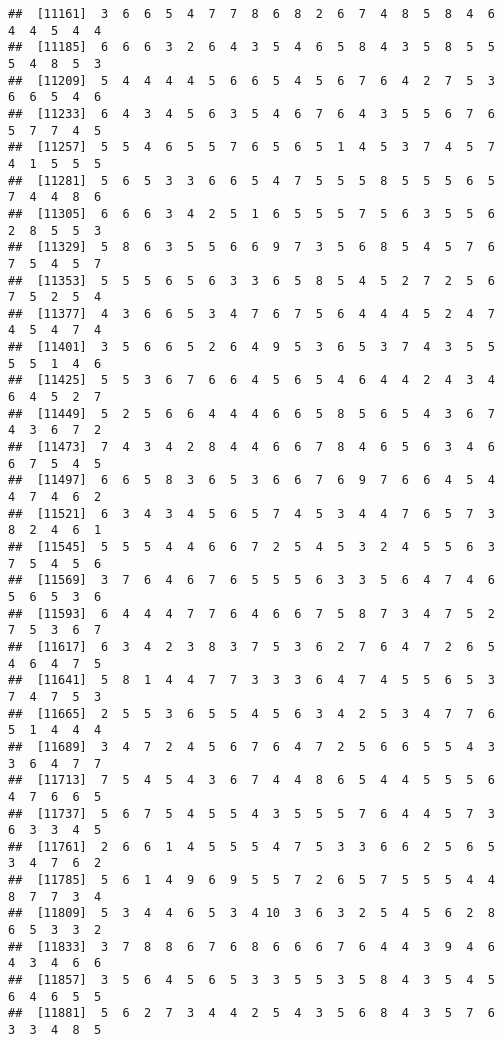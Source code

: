 \documentclass[
]{book}
\begin{document}
\begin{verbatim}
##  [11161]  3  6  6  5  4  7  7  8  6  8  2  6  7  4  8  5  8  4  6  4  4  5  4  4
##  [11185]  6  6  6  3  2  6  4  3  5  4  6  5  8  4  3  5  8  5  5  5  4  8  5  3
##  [11209]  5  4  4  4  4  5  6  6  5  4  5  6  7  6  4  2  7  5  3  6  6  5  4  6
##  [11233]  6  4  3  4  5  6  3  5  4  6  7  6  4  3  5  5  6  7  6  5  7  7  4  5
##  [11257]  5  5  4  6  5  5  7  6  5  6  5  1  4  5  3  7  4  5  7  4  1  5  5  5
##  [11281]  5  6  5  3  3  6  6  5  4  7  5  5  5  8  5  5  5  6  5  7  4  4  8  6
##  [11305]  6  6  6  3  4  2  5  1  6  5  5  5  7  5  6  3  5  5  6  2  8  5  5  3
##  [11329]  5  8  6  3  5  5  6  6  9  7  3  5  6  8  5  4  5  7  6  7  5  4  5  7
##  [11353]  5  5  5  6  5  6  3  3  6  5  8  5  4  5  2  7  2  5  6  7  5  2  5  4
##  [11377]  4  3  6  6  5  3  4  7  6  7  5  6  4  4  4  5  2  4  7  4  5  4  7  4
##  [11401]  3  5  6  6  5  2  6  4  9  5  3  6  5  3  7  4  3  5  5  5  5  1  4  6
##  [11425]  5  5  3  6  7  6  6  4  5  6  5  4  6  4  4  2  4  3  4  6  4  5  2  7
##  [11449]  5  2  5  6  6  4  4  4  6  6  5  8  5  6  5  4  3  6  7  4  3  6  7  2
##  [11473]  7  4  3  4  2  8  4  4  6  6  7  8  4  6  5  6  3  4  6  6  7  5  4  5
##  [11497]  6  6  5  8  3  6  5  3  6  6  7  6  9  7  6  6  4  5  4  4  7  4  6  2
##  [11521]  6  3  4  3  4  5  6  5  7  4  5  3  4  4  7  6  5  7  3  8  2  4  6  1
##  [11545]  5  5  5  4  4  6  6  7  2  5  4  5  3  2  4  5  5  6  3  7  5  4  5  6
##  [11569]  3  7  6  4  6  7  6  5  5  5  6  3  3  5  6  4  7  4  6  5  6  5  3  6
##  [11593]  6  4  4  4  7  7  6  4  6  6  7  5  8  7  3  4  7  5  2  7  5  3  6  7
##  [11617]  6  3  4  2  3  8  3  7  5  3  6  2  7  6  4  7  2  6  5  4  6  4  7  5
##  [11641]  5  8  1  4  4  7  7  3  3  3  6  4  7  4  5  5  6  5  3  7  4  7  5  3
##  [11665]  2  5  5  3  6  5  5  4  5  6  3  4  2  5  3  4  7  7  6  5  1  4  4  4
##  [11689]  3  4  7  2  4  5  6  7  6  4  7  2  5  6  6  5  5  4  3  3  6  4  7  7
##  [11713]  7  5  4  5  4  3  6  7  4  4  8  6  5  4  4  5  5  5  6  4  7  6  6  5
##  [11737]  5  6  7  5  4  5  5  4  3  5  5  5  7  6  4  4  5  7  3  6  3  3  4  5
##  [11761]  2  6  6  1  4  5  5  5  4  7  5  3  3  6  6  2  5  6  5  3  4  7  6  2
##  [11785]  5  6  1  4  9  6  9  5  5  7  2  6  5  7  5  5  5  4  4  8  7  7  3  4
##  [11809]  5  3  4  4  6  5  3  4 10  3  6  3  2  5  4  5  6  2  8  6  5  3  3  2
##  [11833]  3  7  8  8  6  7  6  8  6  6  6  7  6  4  4  3  9  4  6  4  3  4  6  6
##  [11857]  3  5  6  4  5  6  5  3  3  5  5  3  5  8  4  3  5  4  5  6  4  6  5  5
##  [11881]  5  6  2  7  3  4  4  2  5  4  3  5  6  8  4  3  5  7  6  3  3  4  8  5

\end{verbatim}
\end{document}
